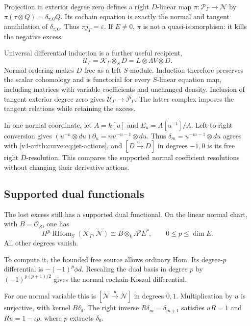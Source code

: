 Projection in exterior degree zero defines a right $D$-linear
map $\pi:\mathcal P_\Gamma\to\mathcal N$ by
$\pi(\tau\otimes Q)=\delta_{\tau,0}Q$.
Its cochain equation is exactly the normal and tangent
annihilation of $\delta_{\tau,0}$.
Thus $\pi j_\Gamma=\varepsilon$.
If $E\ne0$, $\pi$ is not a quasi-isomorphism: it kills the
negative excess.

Universal differential induction is a further useful recipient,
\[
 \mathcal U_\Gamma=\mathcal K_\Gamma\otimes_SD
                 =L\otimes\Lambda V\otimes D.
\]
Normal ordering makes $D$ free as a left $S$-module. Induction
therefore preserves the scalar cohomology and is functorial for
every $S$-linear equation map, including matrices with variable
coefficients and unchanged density. Inclusion of tangent exterior
degree zero gives $\mathcal U_\Gamma\to\mathcal P_\Gamma$.
The latter complex imposes the tangent relations while retaining
the excess.

In one normal coordinate, let $A=k[u]$ and
$E_u=A[u^{-1}]/A$. Left-to-right conversion gives
$(u^{-n}\otimes du)\partial_u=n u^{-n-1}\otimes du$.
Thus $\delta_m=u^{-m-1}\otimes du$ agrees with
\eqref{v4-arith:curve:eq:jet-actions}, and
$[D\xrightarrow{u\cdot}D]$ in degrees $-1,0$ is its free
right $D$-resolution. This compares the supported normal
coefficient resolutions without changing their derivative actions.

\subsection{Supported dual functionals}

The lost excess still has a supported dual functional. On the
linear normal chart, with $B=\mathcal O_Z$, one has
\begin{equation}\label{v4-arith:curve:eq:supported-dual}
 H^p\operatorname{RHom}_S(\mathcal K_\Gamma,\mathcal N)
       \cong B\otimes_k\Lambda^pE^*,\qquad 0\leq p\leq\dim E.
\end{equation}
All other degrees vanish.

To compute it, the bounded free source
allows ordinary Hom. Its degree-$p$ differential is
$-(-1)^p\phi d$. Rescaling the dual basis in degree $p$ by
$(-1)^{p(p+1)/2}$ gives the normal cochain Koszul differential.

For one normal variable this is
$[\mathcal N\xrightarrow{u}\mathcal N]$ in degrees $0,1$.
Multiplication by $u$ is surjective, with kernel $B\delta_0$.
The right inverse $R\delta_m=\delta_{m+1}$ satisfies
$uR=1$ and $Ru=1-\iota p$, where $p$ extracts $\delta_0$.

